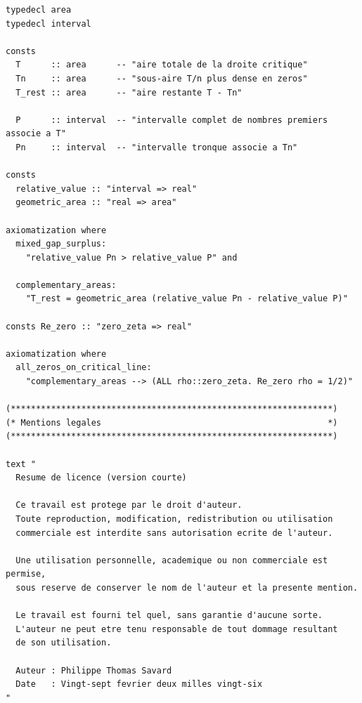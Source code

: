 \documentclass[a4paper,11pt]{article}
\begin{document}
\begin{holcode}[title={\textcolor{white}{File: methode\_spectral.thy -- Part 6/6 (END)}}]
\begin{lstlisting}
typedecl area
typedecl interval

consts
  T      :: area      -- "aire totale de la droite critique"
  Tn     :: area      -- "sous-aire T/n plus dense en zeros"
  T_rest :: area      -- "aire restante T - Tn"

  P      :: interval  -- "intervalle complet de nombres premiers associe a T"
  Pn     :: interval  -- "intervalle tronque associe a Tn"

consts
  relative_value :: "interval => real"
  geometric_area :: "real => area"

axiomatization where
  mixed_gap_surplus:
    "relative_value Pn > relative_value P" and

  complementary_areas:
    "T_rest = geometric_area (relative_value Pn - relative_value P)"

consts Re_zero :: "zero_zeta => real"

axiomatization where
  all_zeros_on_critical_line:
    "complementary_areas --> (ALL rho::zero_zeta. Re_zero rho = 1/2)"

(****************************************************************)
(* Mentions legales                                             *)
(****************************************************************)

text "
  Resume de licence (version courte)

  Ce travail est protege par le droit d'auteur.
  Toute reproduction, modification, redistribution ou utilisation
  commerciale est interdite sans autorisation ecrite de l'auteur.

  Une utilisation personnelle, academique ou non commerciale est permise,
  sous reserve de conserver le nom de l'auteur et la presente mention.

  Le travail est fourni tel quel, sans garantie d'aucune sorte.
  L'auteur ne peut etre tenu responsable de tout dommage resultant
  de son utilisation.

  Auteur : Philippe Thomas Savard
  Date   : Vingt-sept fevrier deux milles vingt-six
"
\end{lstlisting}
\end{holcode}

\end{document}
